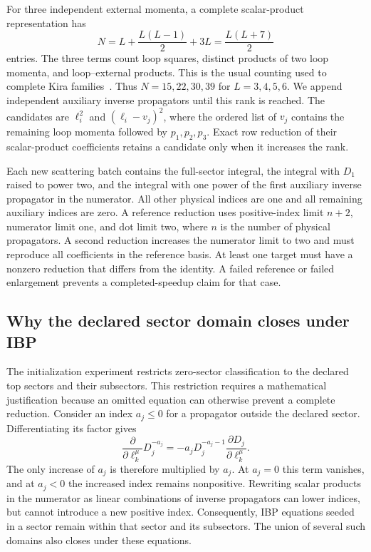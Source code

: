 For three independent external momenta, a complete scalar-product representation has
\begin{equation}
 N=L+\frac{L(L-1)}2+3L=\frac{L(L+7)}2
 \label{eq:higher-count}
\end{equation}
entries. The three terms count loop squares, distinct products of two loop momenta, and loop--external products. This is the usual counting used to complete Kira families~\cite{Kira3}. Thus $N=15,22,30,39$ for $L=3,4,5,6$. We append independent auxiliary inverse propagators until this rank is reached. The candidates are $\ell_i^2$ and $(\ell_i-v_j)^2$, where the ordered list of $v_j$ contains the remaining loop momenta followed by $p_1,p_2,p_3$. Exact row reduction of their scalar-product coefficients retains a candidate only when it increases the rank.

Each new scattering batch contains the full-sector integral, the integral with $D_1$ raised to power two, and the integral with one power of the first auxiliary inverse propagator in the numerator. All other physical indices are one and all remaining auxiliary indices are zero. A reference reduction uses positive-index limit $n+2$, numerator limit one, and dot limit two, where $n$ is the number of physical propagators. A second reduction increases the numerator limit to two and must reproduce all coefficients in the reference basis. At least one target must have a nonzero reduction that differs from the identity. A failed reference or failed enlargement prevents a completed-speedup claim for that case.

\subsection{Why the declared sector domain closes under IBP}
The initialization experiment restricts zero-sector classification to the declared top sectors and their subsectors. This restriction requires a mathematical justification because an omitted equation can otherwise prevent a complete reduction. Consider an index $a_j\leq0$ for a propagator outside the declared sector. Differentiating its factor gives
\begin{equation}
 \frac{\partial}{\partial\ell_k^\mu}D_j^{-a_j}
 =-a_jD_j^{-a_j-1}\frac{\partial D_j}{\partial\ell_k^\mu}.
 \label{eq:higher-closure}
\end{equation}
The only increase of $a_j$ is therefore multiplied by $a_j$. At $a_j=0$ this term vanishes, and at $a_j<0$ the increased index remains nonpositive. Rewriting scalar products in the numerator as linear combinations of inverse propagators can lower indices, but cannot introduce a new positive index. Consequently, IBP equations seeded in a sector remain within that sector and its subsectors. The union of several such domains also closes under these equations.

